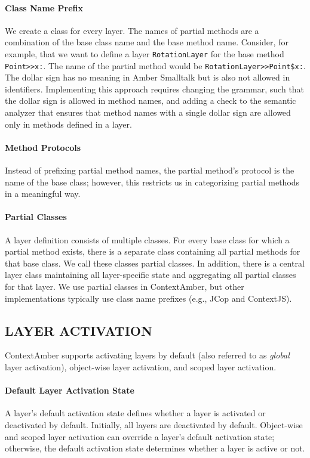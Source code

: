 \documentclass{sig-alternate}
\begin{document}
\paragraph{Class Name Prefix}
We create a class for every layer. The names of partial methods are a combination of the base class name and the base method name. Consider, for example, that we want to define a layer \texttt{RotationLayer} for the base method \texttt{Point>>x:}. The name of the partial method would be \texttt{RotationLayer>>Point\$x:}. The dollar sign has no meaning in Amber Smalltalk but is also not allowed in identifiers. Implementing this approach requires changing the grammar, such that the dollar sign is allowed in method names, and adding a check to the semantic analyzer that ensures that method names with a single dollar sign are allowed only in methods defined in a layer.

\paragraph{Method Protocols}
Instead of prefixing partial method names, the partial method's protocol is the name of the base class; however, this restricts us in categorizing partial methods in a meaningful way.

\paragraph{Partial Classes}
A layer definition consists of multiple classes. For every base class for which a partial method exists, there is a separate class containing all partial methods for that base class. We call these classes partial classes. In addition, there is a central layer class maintaining all layer-specific state and aggregating all partial classes for that layer. We use partial classes in ContextAmber, but other implementations typically use class name prefixes (e.g., JCop and ContextJS).

\subsection{LAYER ACTIVATION}
ContextAmber supports activating layers by default (also referred to as \emph{global} layer activation), object-wise layer activation, and scoped layer activation.

\paragraph{Default Layer Activation State}
A layer's default activation state defines whether a layer is activated or deactivated by default. Initially, all layers are deactivated by default. Object-wise and scoped layer activation can override a layer's default activation state; otherwise, the default activation state determines whether a layer is active or not. 
\end{document}

